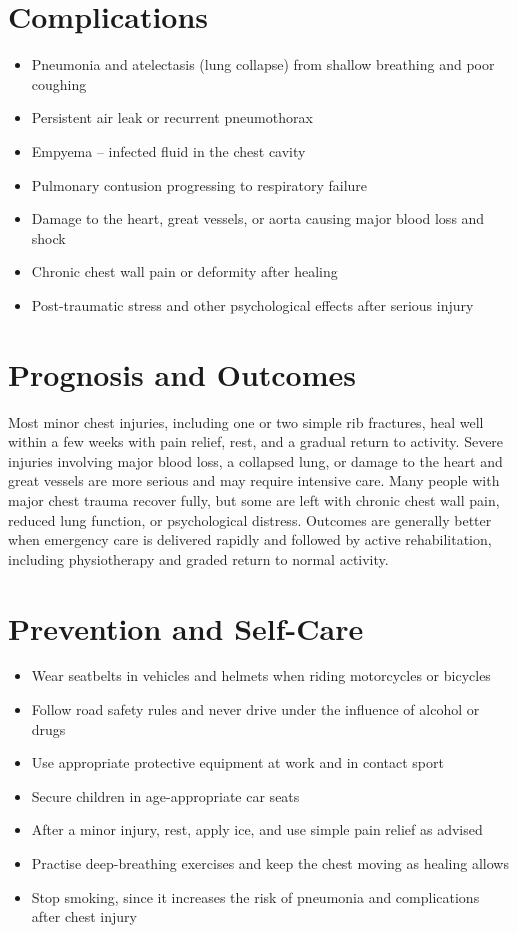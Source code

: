 \section*{Complications}
\begin{itemize}
    \item Pneumonia and atelectasis (lung collapse) from shallow breathing and poor coughing
    \item Persistent air leak or recurrent pneumothorax
    \item Empyema -- infected fluid in the chest cavity
    \item Pulmonary contusion progressing to respiratory failure
    \item Damage to the heart, great vessels, or aorta causing major blood loss and shock
    \item Chronic chest wall pain or deformity after healing
    \item Post-traumatic stress and other psychological effects after serious injury
\end{itemize}

\section*{Prognosis and Outcomes}
Most minor chest injuries, including one or two simple rib fractures, heal well within a few weeks with pain relief, rest, and a gradual return to activity. Severe injuries involving major blood loss, a collapsed lung, or damage to the heart and great vessels are more serious and may require intensive care. Many people with major chest trauma recover fully, but some are left with chronic chest wall pain, reduced lung function, or psychological distress. Outcomes are generally better when emergency care is delivered rapidly and followed by active rehabilitation, including physiotherapy and graded return to normal activity.

\section*{Prevention and Self-Care}
\begin{itemize}
    \item Wear seatbelts in vehicles and helmets when riding motorcycles or bicycles
    \item Follow road safety rules and never drive under the influence of alcohol or drugs
    \item Use appropriate protective equipment at work and in contact sport
    \item Secure children in age-appropriate car seats
    \item After a minor injury, rest, apply ice, and use simple pain relief as advised
    \item Practise deep-breathing exercises and keep the chest moving as healing allows
    \item Stop smoking, since it increases the risk of pneumonia and complications after chest injury
\end{itemize}


